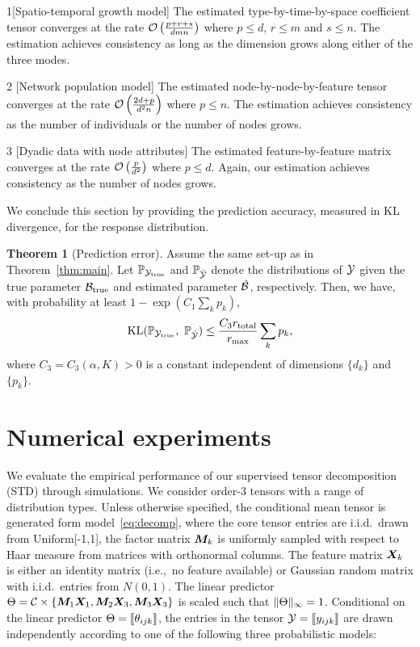 \documentclass[12pt]{article}
\theoremstyle{definition}
\newtheorem{thm}{Theorem}[section]
\theoremstyle{definition}
\begin{document}
\begin{customexample}{1}[Spatio-temporal growth model] The estimated type-by-time-by-space coefficient tensor converges at the rate $\mathcal{O}\left(\frac{p+r+s}{dmn}\right)$ where $p\leq d$, $r\leq m$ and $s\leq n$. The estimation achieves consistency as long as the dimension grows along either of the three modes.
\end{customexample}

\begin{customexample}{2} [Network population model] The estimated node-by-node-by-feature tensor converges at the rate $\mathcal{O}\left(\frac{2d+p}{d^2n}\right)$ where $p\leq n$. The estimation achieves consistency as the number of individuals or the number of nodes grows. 
\end{customexample}

\begin{customexample}{3} [Dyadic data with node attributes] The estimated feature-by-feature matrix converges at the rate $\mathcal{O}\left(\frac{p}{d^2}\right)$ where $p\leq d$. Again, our estimation achieves consistency as the number of nodes grows. 
\end{customexample}

We conclude this section by providing the prediction accuracy, measured in KL divergence, for the response distribution.   

\begin{thm}[Prediction error]\label{thm:KL}
Assume the same set-up as in Theorem~\ref{thm:main}. Let $\mathbb{P}_{\mathcal{Y}_{\textup{true}}}$ and $\mathbb{P}_{\hat {\mathcal{Y}}}$ denote the distributions of $\mathcal{Y}$ given the true parameter $\mathcal{B}_{\textup{true}}$ and estimated parameter $\hat {\mathcal{B}}$, respectively. Then, we have, with probability at least $1-\exp(C_1\sum_k p_k)$,
\[
\textup{KL}(\mathbb{P}_{\tY_{\textup{true}}},\ \mathbb{P}_{\hat \tY})\leq \frac{C_3r_{\textup{total}}}{r_{\max}}\sum_k p_k,
\]
where $C_3=C_3(\alpha, K)>0$ is a constant independent of dimensions $\{d_k\}$ and $\{p_k\}$.
\end{thm}

\section{Numerical experiments}\label{sec:simulation}
We evaluate the empirical performance of our supervised tensor decomposition (STD) through simulations. We consider order-3 tensors with a range of distribution types. Unless otherwise specified, the conditional mean tensor is generated form model~\eqref{eq:decomp}, where the core tensor entries are i.i.d.\ drawn from Uniform[-1,1], the factor matrix $\bm M_k$ is uniformly sampled with respect to Haar measure from matrices with orthonormal columns. The feature matrix $\bm X_k$ is either an identity matrix (i.e.,\ no feature  available) or Gaussian random matrix with i.i.d.\ entries from $N(0,1)$. The linear predictor $\Theta=\mathcal{C}\times\{\bm M_1\bm X_1,\bm M_2\bm X_3,\bm M_3\bm X_3\}$ is scaled such that $\lVert\Theta\rVert_\infty=1$. Conditional on the linear predictor $\Theta=\llbracket \theta_{ijk} \rrbracket$, the entries in the tensor $\mathcal{Y}=\llbracket y_{ijk} \rrbracket$ are drawn independently according to one of the following three probabilistic models:
\end{document}
